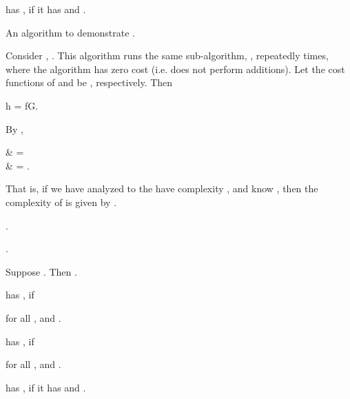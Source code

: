 \documentclass[b5paper, english, oneside]{memoir}
\begin{document}
\begin{definition}
 has , if it has  and .
\end{definition}

\begin{algorithm}
\caption{An algorithm to demonstrate .}
\label{alg:multiply}
\begin{algorithmic}[1]
\For{}
  \State {}
\EndFor
\EndProcedure
\end{algorithmic}
\end{algorithm}

\begin{example}
Consider , . This algorithm runs the same sub-algorithm, , repeatedly  times, where the algorithm  has zero cost (i.e. does not perform additions). Let the cost functions of  and  be , respectively. Then 
\begin{eqs}
h = fG.
\end{eqs}
By ,
\begin{eqs}
 & =  \\
{} & =  \cdot {}.
\end{eqs}
That is, if we have analyzed  to the have complexity , and know , then the complexity of  is given by .
\end{example}

\begin{example}
.
\end{example}

\begin{example}
.
\end{example}

\begin{example}
Suppose . Then .
\end{example}

\begin{definition}
 has , if

for all , and .
\end{definition}

\begin{definition}
 has , if

for all , and .
\end{definition}

\begin{definition}
 has , if it has  and .
\end{definition}
\end{document}
